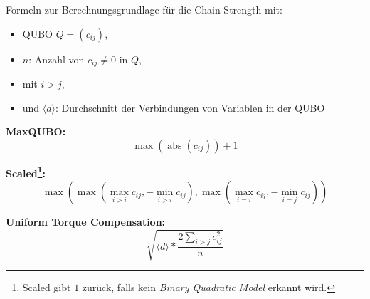 Formeln zur Berechnungsgrundlage für die Chain Strength mit:
\begin{itemize}
\item QUBO $Q=\left(c_{i j}\right)$, 
\item $n$:  Anzahl von $c_{i j} \neq 0$ in $Q$, 
\item mit $i>j$,
\item und  $\langle d\rangle$: Durchschnitt der Verbindungen von Variablen in der QUBO 

\end{itemize}
\vspace{5mm}

\textbf{MaxQUBO:}
\vspace{5mm}
 \begin{equation}
 \max \left(\operatorname{abs}\left(c_{i j}\right)\right)+1
 \end{equation}
\vspace{10mm}

\textbf{Scaled\footnote{Scaled gibt $1$ zurück, falls kein \textit{Binary Quadratic Model} erkannt wird.}:}
\vspace{5mm}
 \begin{equation}
 \max \left(\max \left(\max _{i>i} c_{i j},-\min _{i>i} c_{i j}\right), \max \left(\max _{i=i} c_{i j},-\min _{i=j} c_{i j}\right)\right)
 \end{equation}
\vspace{10mm}

\textbf{Uniform Torque Compensation:}
\vspace{5mm}
 \begin{equation}
 \sqrt{\langle d\rangle * \frac{2 \sum_{i>j} c_{i j}^{2}}{n}}
 \end{equation}
\vspace{15mm}



